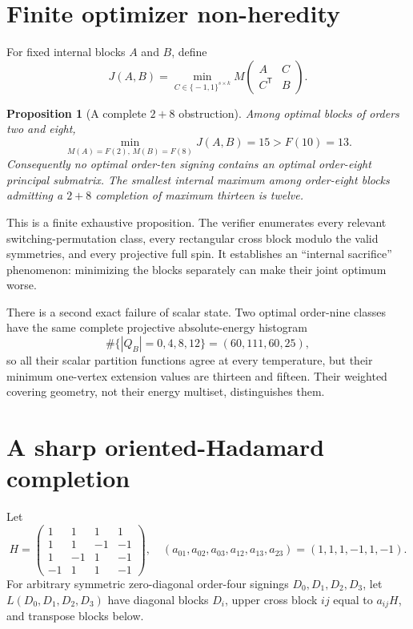 \documentclass[11pt]{article}
\newcommand{\eps}{\{\!-1,1\!\}}
\newcommand{\T}{\mathsf T}
\newtheorem{proposition}[theorem]{Proposition}
\theoremstyle{remark}
\begin{document}
\section{Finite optimizer non-heredity}\label{sec:nonhered}

For fixed internal blocks $A$ and $B$, define
\[
 J(A,B)=\min_{C\in\eps^{s\times k}}
 M\begin{pmatrix}A&C\\C^{\T}&B\end{pmatrix}.
\]

\begin{proposition}[A complete $2+8$ obstruction]
Among optimal blocks of orders two and eight,
\[
 \min_{M(A)=F(2),\,M(B)=F(8)}J(A,B)=15>F(10)=13.
\]
Consequently no optimal order-ten signing contains an optimal order-eight
principal submatrix.  The smallest internal maximum among order-eight blocks
admitting a $2+8$ completion of maximum thirteen is twelve.
\end{proposition}

This is a finite exhaustive proposition.  The verifier enumerates every
relevant switching-permutation class, every rectangular cross block modulo
the valid symmetries, and every projective full spin.  It establishes an
``internal sacrifice'' phenomenon: minimizing the blocks separately can make
their joint optimum worse.

There is a second exact failure of scalar state.  Two optimal order-nine
classes have the same complete projective absolute-energy histogram
\[
 \#\{|Q_B|=0,4,8,12\}=(60,111,60,25),
\]
so all their scalar partition functions agree at every temperature, but their
minimum one-vertex extension values are thirteen and fifteen.  Their weighted
covering geometry, not their energy multiset, distinguishes them.

\section{A sharp oriented-Hadamard completion}\label{sec:hadamard}

Let
\[
H=\begin{pmatrix}
1&1&1&1\\1&1&-1&-1\\1&-1&1&-1\\-1&1&1&-1
\end{pmatrix},
\quad
(a_{01},a_{02},a_{03},a_{12},a_{13},a_{23})
=(1,1,1,-1,1,-1).
\]
For arbitrary symmetric zero-diagonal order-four signings
$D_0,D_1,D_2,D_3$, let $L(D_0,D_1,D_2,D_3)$ have diagonal blocks $D_i$,
upper cross block $ij$ equal to $a_{ij}H$, and transpose blocks below.
\end{document}

